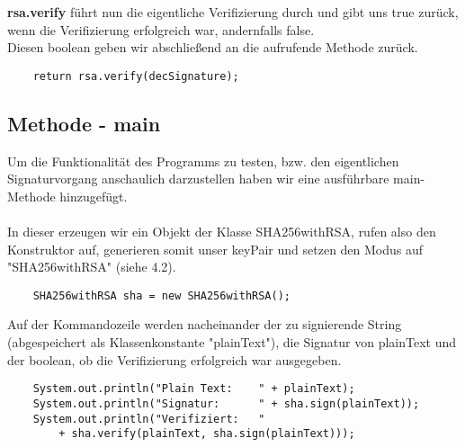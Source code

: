 \documentclass[12pt]{article}
\begin{document}
\textbf{rsa.verify} führt nun die eigentliche Verifizierung durch und gibt uns true zurück, wenn die Verifizierung erfolgreich war, andernfalls false.\\
Diesen boolean geben wir abschließend an die aufrufende Methode zurück.

\begin{lstlisting}
    return rsa.verify(decSignature);
\end{lstlisting}

\newpage

\subsection{Methode - main}

Um die Funktionalität des Programms zu testen, bzw. den eigentlichen Signaturvorgang anschaulich darzustellen haben wir eine ausführbare main-Methode hinzugefügt.\\ \\
In dieser erzeugen wir ein Objekt der Klasse SHA256withRSA, rufen also den Konstruktor auf, generieren somit unser keyPair und setzen den Modus auf "SHA256withRSA" (siehe 4.2).

\begin{lstlisting}
    SHA256withRSA sha = new SHA256withRSA();
\end{lstlisting}

Auf der Kommandozeile werden nacheinander der zu signierende String (abgespeichert als Klassenkonstante "plainText"), die Signatur von plainText und der boolean, ob die Verifizierung erfolgreich war ausgegeben.

\begin{lstlisting}
    System.out.println("Plain Text:    " + plainText);
    System.out.println("Signatur:      " + sha.sign(plainText));
    System.out.println("Verifiziert:   "
        + sha.verify(plainText, sha.sign(plainText)));
\end{lstlisting}
\end{document}

